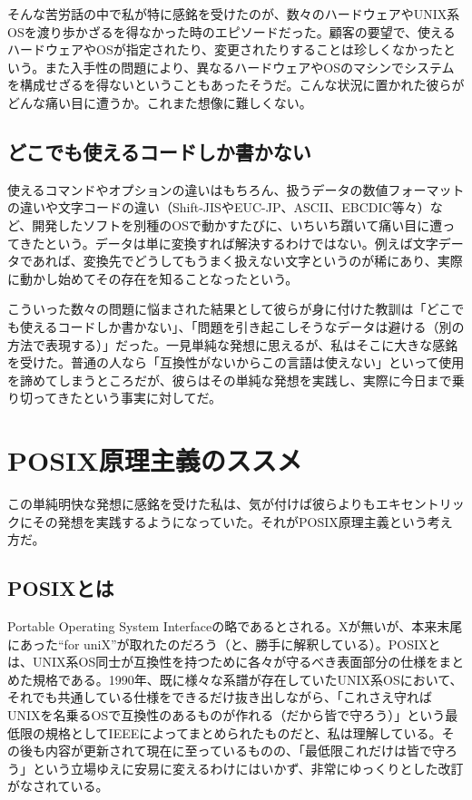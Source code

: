 そんな苦労話の中で私が特に感銘を受けたのが、数々のハードウェアやUNIX系OSを渡り歩かざるを得なかった時のエピソードだった。顧客の要望で、使えるハードウェアやOSが指定されたり、変更されたりすることは珍しくなかったという。また入手性の問題により、異なるハードウェアやOSのマシンでシステムを構成せざるを得ないということもあったそうだ。こんな状況に置かれた彼らがどんな痛い目に遭うか。これまた想像に難しくない。

\subsection*{どこでも使えるコードしか書かない}

使えるコマンドやオプションの違いはもちろん、扱うデータの数値フォーマットの違いや文字コードの違い（Shift-JISやEUC-JP、ASCII、EBCDIC等々）など、開発したソフトを別種のOSで動かすたびに、いちいち躓いて痛い目に遭ってきたという。データは単に変換すれば解決するわけではない。例えば文字データであれば、変換先でどうしてもうまく扱えない文字というのが稀にあり、実際に動かし始めてその存在を知ることなったという。

こういった数々の問題に悩まされた結果として彼らが身に付けた教訓は「どこでも使えるコードしか書かない」、「問題を引き起こしそうなデータは避ける（別の方法で表現する）」だった。一見単純な発想に思えるが、私はそこに大きな感銘を受けた。普通の人なら「互換性がないからこの言語は使えない」といって使用を諦めてしまうところだが、彼らはその単純な発想を実践し、実際に今日まで乗り切ってきたという事実に対してだ。


\section*{POSIX原理主義のススメ}

この単純明快な発想に感銘を受けた私は、気が付けば彼らよりもエキセントリックにその発想を実践するようになっていた。それがPOSIX原理主義という考え方だ。

\subsection*{POSIXとは}

Portable Operating System Interfaceの略であるとされる。Xが無いが、本来末尾にあった``for uniX''が取れたのだろう（と、勝手に解釈している）。POSIXとは、UNIX系OS同士が互換性を持つために各々が守るべき表面部分の仕様をまとめた規格である。1990年、既に様々な系譜が存在していたUNIX系OSにおいて、それでも共通している仕様をできるだけ抜き出しながら、「これさえ守ればUNIXを名乗るOSで互換性のあるものが作れる（だから皆で守ろう）」という最低限の規格としてIEEEによってまとめられたものだと、私は理解している。その後も内容が更新されて現在に至っているものの、「最低限これだけは皆で守ろう」という立場ゆえに安易に変えるわけにはいかず、非常にゆっくりとした改訂がなされている。

